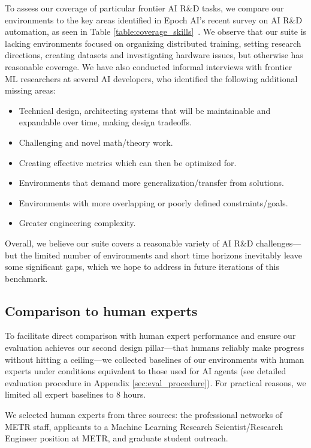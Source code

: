 \documentclass{article}
\begin{document}
To assess our coverage of particular frontier AI R\&D tasks, we compare our environments to the key areas identified in Epoch AI's recent survey on AI R\&D automation, as seen in Table \ref{table:coverage_skills}~\cite{owen2024interviewingairesearchersonautomationofairnd}. We observe that our suite is lacking environments focused on organizing distributed training, setting research directions, creating datasets and investigating hardware issues, but otherwise has reasonable coverage. We have also conducted informal interviews with frontier ML researchers at several AI developers, who identified the following additional missing areas:

\begin{itemize}
    \item Technical design, architecting systems that will be maintainable and expandable over time, making design tradeoffs.
    \item Challenging and novel math/theory work.
    \item Creating effective metrics which can then be optimized for.
    \item Environments that demand more generalization/transfer from solutions. 
    \item Environments with more overlapping or poorly defined constraints/goals. 
    \item Greater engineering complexity. 
\end{itemize}

Overall, we believe our suite covers a reasonable variety of AI R\&D challenges---but the limited number of environments and short time horizons inevitably leave some significant gaps, which we hope to address in future iterations of this benchmark. 

\subsection{Comparison to human experts}

To facilitate direct comparison with human expert performance and ensure our evaluation achieves our second design pillar---that humans reliably make progress without hitting a ceiling---we collected baselines of our environments with human experts under conditions equivalent to those used for AI agents (see detailed evaluation procedure in Appendix \ref{sec:eval_procedure}). For practical reasons, we limited all expert baselines to 8 hours.

We selected human experts from three sources: the professional networks of METR staff, applicants to a Machine Learning Research Scientist/Research Engineer position at METR, and graduate student outreach. 
\end{document}
